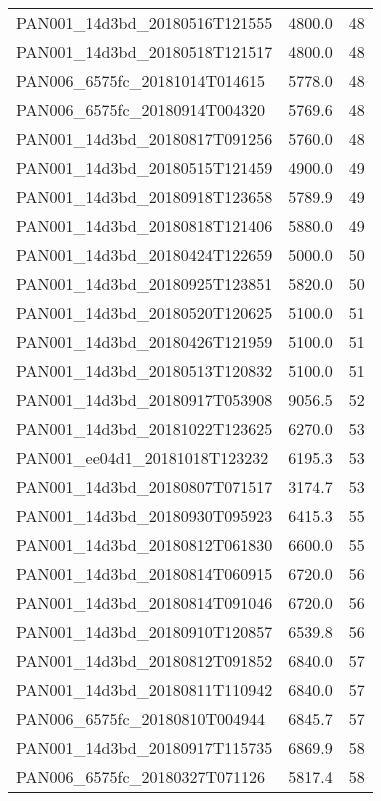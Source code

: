 \begin{tabular}{lrr}
PAN001\_14d3bd\_20180516T121555 &     4800.0 &       48 \\
PAN001\_14d3bd\_20180518T121517 &     4800.0 &       48 \\
PAN006\_6575fc\_20181014T014615 &     5778.0 &       48 \\
PAN006\_6575fc\_20180914T004320 &     5769.6 &       48 \\
PAN001\_14d3bd\_20180817T091256 &     5760.0 &       48 \\
PAN001\_14d3bd\_20180515T121459 &     4900.0 &       49 \\
PAN001\_14d3bd\_20180918T123658 &     5789.9 &       49 \\
PAN001\_14d3bd\_20180818T121406 &     5880.0 &       49 \\
PAN001\_14d3bd\_20180424T122659 &     5000.0 &       50 \\
PAN001\_14d3bd\_20180925T123851 &     5820.0 &       50 \\
PAN001\_14d3bd\_20180520T120625 &     5100.0 &       51 \\
PAN001\_14d3bd\_20180426T121959 &     5100.0 &       51 \\
PAN001\_14d3bd\_20180513T120832 &     5100.0 &       51 \\
PAN001\_14d3bd\_20180917T053908 &     9056.5 &       52 \\
PAN001\_14d3bd\_20181022T123625 &     6270.0 &       53 \\
PAN001\_ee04d1\_20181018T123232 &     6195.3 &       53 \\
PAN001\_14d3bd\_20180807T071517 &     3174.7 &       53 \\
PAN001\_14d3bd\_20180930T095923 &     6415.3 &       55 \\
PAN001\_14d3bd\_20180812T061830 &     6600.0 &       55 \\
PAN001\_14d3bd\_20180814T060915 &     6720.0 &       56 \\
PAN001\_14d3bd\_20180814T091046 &     6720.0 &       56 \\
PAN001\_14d3bd\_20180910T120857 &     6539.8 &       56 \\
PAN001\_14d3bd\_20180812T091852 &     6840.0 &       57 \\
PAN001\_14d3bd\_20180811T110942 &     6840.0 &       57 \\
PAN006\_6575fc\_20180810T004944 &     6845.7 &       57 \\
PAN001\_14d3bd\_20180917T115735 &     6869.9 &       58 \\
PAN006\_6575fc\_20180327T071126 &     5817.4 &       58 \\

\end{tabular}
